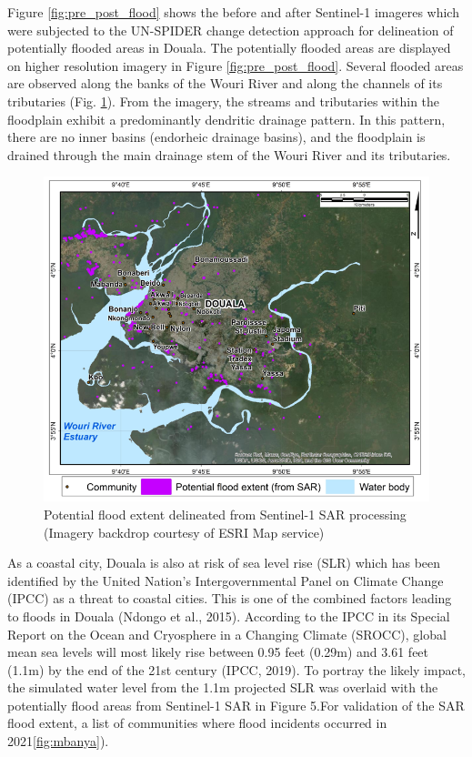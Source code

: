 Figure \ref{fig:pre_post_flood} shows the before and after Sentinel-1 imageres which were subjected to the UN-SPIDER change detection approach for delineation of potentially flooded areas in Douala. 
The potentially flooded areas are displayed on higher resolution imagery in Figure \ref{fig:pre_post_flood}. Several flooded areas are observed along the banks of the Wouri River and along the channels of its tributaries (Fig. \ref{fig:flood_map}). From the imagery, the streams and tributaries within the floodplain exhibit a predominantly dendritic drainage pattern. In this pattern, there are no inner basins (endorheic drainage basins), and the floodplain is drained through the main drainage stem of the Wouri River and its tributaries. 

\begin{figure} %
	\centering
	\includegraphics[width=0.45\linewidth]{figure/Douala_ops_1_IPCC_SAR_layA}
	\caption{Potential flood extent delineated from Sentinel-1 SAR processing (Imagery backdrop courtesy of ESRI Map service)}
	\label{fig:flood_map}
\end{figure}

As a coastal city, Douala is also at risk of sea level rise (SLR) which has been identified by the United Nation’s Intergovernmental Panel on Climate Change (IPCC) as a threat to coastal cities. This is one of the combined factors leading to floods in Douala (Ndongo et al.,  2015). According to the IPCC in its Special Report on the Ocean and Cryosphere in a Changing Climate (SROCC), global mean sea levels will most likely rise between 0.95 feet (0.29m) and 3.61 feet (1.1m) by the end of the 21st century (IPCC, 2019). To portray the likely impact, the simulated water level from the 1.1m projected SLR was overlaid with the potentially flood areas from Sentinel-1 SAR in Figure 5.For validation of the SAR flood extent, a list of communities where flood incidents occurred in 2021\ref{fig:mbanya}).


